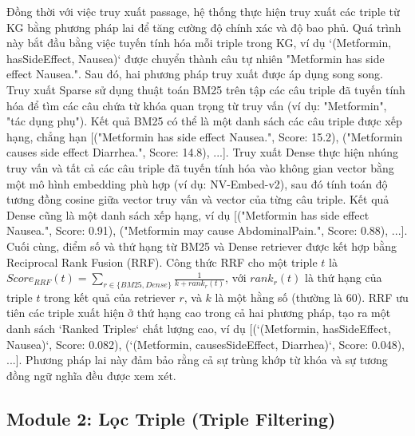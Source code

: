 \documentclass[../main.tex]{subfiles}
\begin{document}
Đồng thời với việc truy xuất passage, hệ thống thực hiện truy xuất các triple từ KG bằng phương pháp lai để tăng cường độ chính xác và độ bao phủ. Quá trình này bắt đầu bằng việc tuyến tính hóa mỗi triple trong KG, ví dụ `(Metformin, hasSideEffect, Nausea)` được chuyển thành câu tự nhiên "Metformin has side effect Nausea.". Sau đó, hai phương pháp truy xuất được áp dụng song song. Truy xuất Sparse sử dụng thuật toán BM25 trên tập các câu triple đã tuyến tính hóa để tìm các câu chứa từ khóa quan trọng từ truy vấn (ví dụ: "Metformin", "tác dụng phụ"). Kết quả BM25 có thể là một danh sách các câu triple được xếp hạng, chẳng hạn [("Metformin has side effect Nausea.", Score: 15.2), ("Metformin causes side effect Diarrhea.", Score: 14.8), ...]. Truy xuất Dense thực hiện nhúng truy vấn và tất cả các câu triple đã tuyến tính hóa vào không gian vector bằng một mô hình embedding phù hợp (ví dụ: NV-Embed-v2), sau đó tính toán độ tương đồng cosine giữa vector truy vấn và vector của từng câu triple. Kết quả Dense cũng là một danh sách xếp hạng, ví dụ [("Metformin has side effect Nausea.", Score: 0.91), ("Metformin may cause AbdominalPain.", Score: 0.88), ...]. Cuối cùng, điểm số và thứ hạng từ BM25 và Dense retriever được kết hợp bằng Reciprocal Rank Fusion (RRF). Công thức RRF cho một triple $t$ là $Score_{RRF}(t) = \sum_{r \in \{BM25, Dense\}} \frac{1}{k + rank_r(t)}$, với $rank_r(t)$ là thứ hạng của triple $t$ trong kết quả của retriever $r$, và $k$ là một hằng số (thường là 60). RRF ưu tiên các triple xuất hiện ở thứ hạng cao trong cả hai phương pháp, tạo ra một danh sách `Ranked Triples` chất lượng cao, ví dụ [(`(Metformin, hasSideEffect, Nausea)`, Score: 0.082), (`(Metformin, causesSideEffect, Diarrhea)`, Score: 0.048), ...]. Phương pháp lai này đảm bảo rằng cả sự trùng khớp từ khóa và sự tương đồng ngữ nghĩa đều được xem xét.

\subsection{Module 2: Lọc Triple (Triple Filtering)}
\end{document}
